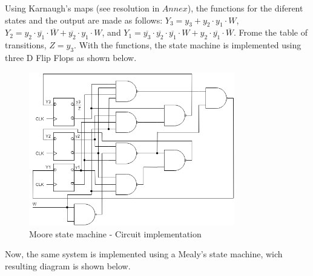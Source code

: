 Using Karnaugh's maps (see resolution in $Annex$), the functions for
the diferent states and the output are made
as follows: $Y_3 = y_3 + y_2 \cdot y_1 \cdot W$, $Y_2 = y_2 \cdot \overline{y_1} \cdot \overline{W} + \overline{y_2} \cdot y_1 \cdot W$,
and $Y_1 = \overline{y_3} \cdot \overline{y_2} \cdot \overline{y_1} \cdot W + y_2 \cdot \overline{y_1} \cdot \overline{W}$.
Frome the table of transitions, $Z = y_3$.
\newpage
With the functions, the state machine is 
implemented using three D Flip Flops as shown below.

\begin{figure}[H]
    \begin{centering}
    \includegraphics[width=0.8\textwidth]{Graficos2/2a_Compuertas_Moore.png}
    \par\end{centering}
    \caption{Moore state machine  - Circuit implementation}
\end{figure}

Now, the same system is implemented using a Mealy's 
state machine, wich resulting diagram is shown below.

